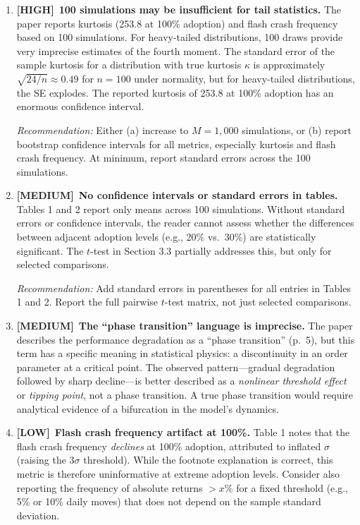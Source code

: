 \documentclass[12pt,a4paper]{article}
\newcommand{\HIGH}{\textbf{\textcolor{highred}{[HIGH]}}}
\newcommand{\MEDIUM}{\textbf{\textcolor{medorange}{[MEDIUM]}}}
\newcommand{\LOW}{\textbf{\textcolor{lowgreen}{[LOW]}}}
\begin{document}
\begin{enumerate}[leftmargin=2em,resume]

\item \HIGH\ \textbf{100 simulations may be insufficient for tail statistics.} The paper reports kurtosis (253.8 at 100\% adoption) and flash crash frequency based on 100 simulations. For heavy-tailed distributions, 100 draws provide very imprecise estimates of the fourth moment. The standard error of the sample kurtosis for a distribution with true kurtosis $\kappa$ is approximately $\sqrt{24/n} \approx 0.49$ for $n=100$ under normality, but for heavy-tailed distributions, the SE explodes. The reported kurtosis of 253.8 at 100\% adoption has an enormous confidence interval.

\textit{Recommendation:} Either (a) increase to $M = 1{,}000$ simulations, or (b) report bootstrap confidence intervals for all metrics, especially kurtosis and flash crash frequency. At minimum, report standard errors across the 100 simulations.

\item \MEDIUM\ \textbf{No confidence intervals or standard errors in tables.} Tables 1 and 2 report only means across 100 simulations. Without standard errors or confidence intervals, the reader cannot assess whether the differences between adjacent adoption levels (e.g., 20\% vs.\ 30\%) are statistically significant. The $t$-test in Section 3.3 partially addresses this, but only for selected comparisons.

\textit{Recommendation:} Add standard errors in parentheses for all entries in Tables 1 and 2. Report the full pairwise $t$-test matrix, not just selected comparisons.

\item \MEDIUM\ \textbf{The ``phase transition'' language is imprecise.} The paper describes the performance degradation as a ``phase transition'' (p.~5), but this term has a specific meaning in statistical physics: a discontinuity in an order parameter at a critical point. The observed pattern---gradual degradation followed by sharp decline---is better described as a \emph{nonlinear threshold effect} or \emph{tipping point}, not a phase transition. A true phase transition would require analytical evidence of a bifurcation in the model's dynamics.

\item \LOW\ \textbf{Flash crash frequency artifact at 100\%.} Table 1 notes that the flash crash frequency \emph{declines} at 100\% adoption, attributed to inflated $\sigma$ (raising the $3\sigma$ threshold). While the footnote explanation is correct, this metric is therefore uninformative at extreme adoption levels. Consider also reporting the frequency of absolute returns $> x\%$ for a fixed threshold (e.g., 5\% or 10\% daily moves) that does not depend on the sample standard deviation.


\end{enumerate}
\end{document}
